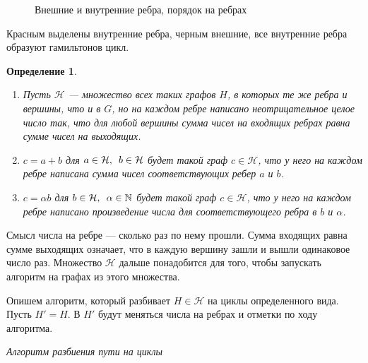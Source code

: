 \documentclass{article}
\newcommand{\squad}{
    \hspace{0.5em}
}
\newtheorem{definition}{Определение}
\begin{document}
\begin{figure}[!htb]
\begin{center}
\caption{Внешние и внутренние ребра, порядок на ребрах}    
\end{center}
\end{figure}

\FloatBarrier

Красным выделены внутренние ребра, черным внешние, все внутренние ребра образуют гамильтонов цикл.

\begin{definition} $ $
    \begin{enumerate}
        \item Пусть $\mathcal{H}$ --- множество всех таких графов $H$, в которых те же ребра и вершины, что и в $G$, но на каждом ребре написано неотрицательное целое число так, что для любой вершины сумма чисел на входящих ребрах равна сумме чисел на выходящих.
        \item $c = a + b$ для $a \in \mathcal{H}, \squad b \in \mathcal{H}$ будет такой граф $c \in \mathcal{H}$, что у него на каждом ребре написана сумма чисел соответствующих ребер $a$ и $b$.
        \item $c = \alpha b$ для $b \in \mathcal{H}, \squad \alpha \in \mathbb{N}$ будет такой граф $c \in \mathcal{H}$, что у него на каждом ребре написано произведение числа для соответствующего ребра в $b$ и $\alpha$.
    \end{enumerate} 
\end{definition}

Смысл числа на ребре --- сколько раз по нему прошли. Сумма входящих равна сумме выходящих означает, что в каждую вершину зашли и вышли одинаковое число раз.
Множество $\mathcal{H}$ дальше понадобится для того, чтобы запускать алгоритм на графах из этого множества.


Опишем алгоритм, который разбивает $H \in \mathcal{H}$ на циклы определенного вида.
Пусть $H' = H$. В $H'$ будут меняться числа на ребрах и отметки по ходу алгоритма.
\begin{center}
    \textit{Алгоритм разбиения пути на циклы}
\end{center}
\end{document}
